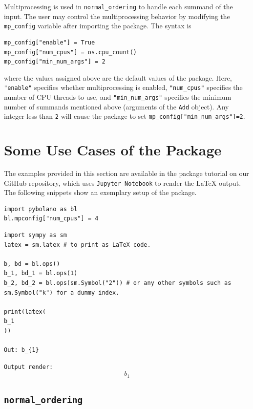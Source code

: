 \documentclass[onecolumn, 12pt, sort&compress]{elsarticle}
\newcommand{\inlinecode}[1]{\texttt{#1}}
\newenvironment{revision2}{%
\color{red}
}
{}
\begin{document}
Multiprocessing is used in \inlinecode{normal_ordering} to handle each summand of the input. The user may control the multiprocessing behavior by modifying the \inlinecode{mp_config} variable after importing the package. The syntax is
\begin{verbatim}
mp_config["enable"] = True
mp_config["num_cpus"] = os.cpu_count()
mp_config["min_num_args"] = 2
\end{verbatim}
where the values assigned above are the default values of the package. Here, \inlinecode{"enable"} specifies whether multiprocessing is enabled, \inlinecode{"num_cpus"} specifies the number of CPU threads to use, and \inlinecode{"min_num_args"} specifies the minimum number of summands mentioned above (arguments of the \inlinecode{Add} object). Any integer less than \inlinecode{2} will cause the package to set \inlinecode{mp_config["min_num_args"]=2}. 


\section{Some Use Cases of the Package}\label{section:examples}

The examples provided in this section are available in the package tutorial on our GitHub repository, which uses \texttt{Jupyter Notebook} to render the \LaTeX{} output. The following snippets show an exemplary setup of the package.
\begin{verbatim}
import pybolano as bl
bl.mpconfig["num_cpus"] = 4
\end{verbatim}

\begin{verbatim}
import sympy as sm
latex = sm.latex # to print as LaTeX code.

b, bd = bl.ops()
b_1, bd_1 = bl.ops(1)
b_2, bd_2 = bl.ops(sm.Symbol("2")) # or any other symbols such as sm.Symbol("k") for a dummy index.

print(latex(
b_1
))

Out: b_{1}
\end{verbatim}
\begin{revision2}
\inlinecode{Output render:}
\begin{equation*}
    b_{1}
\end{equation*}
\end{revision2}

\subsection{\inlinecode{normal_ordering}}
\end{document}
